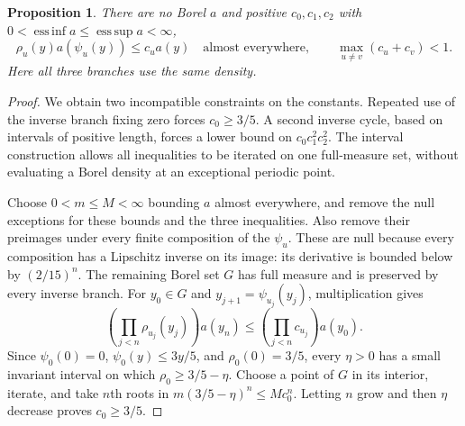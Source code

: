 \documentclass[11pt,reqno]{amsart}
\numberwithin{equation}{section}
\newtheorem{proposition}[theorem]{Proposition}
\theoremstyle{definition}
\theoremstyle{definition}
\begin{document}
\begin{proposition}\label{prop:bounded-density}
There are no Borel $a$ and positive $c_0,c_1,c_2$ with
$0<\operatorname*{ess\,inf}a\le\operatorname*{ess\,sup}a<\infty$,
\[
 \rho_u(y)a(\psi_u(y))\le c_u a(y)\quad\text{almost everywhere},
 \qquad\max_{u\ne v}(c_u+c_v)<1.
\]
Here all three branches use the same density.
\end{proposition}
\begin{proof}
We obtain two incompatible constraints on the constants. Repeated
use of the inverse branch fixing zero forces $c_0\ge3/5$.
A second inverse cycle, based on intervals of positive length,
forces a lower bound on $c_0c_1^2c_2^2$. The interval construction
allows all inequalities to be iterated on one full-measure set,
without evaluating a Borel density at an exceptional periodic point.

Choose $0<m\le M<\infty$ bounding $a$ almost everywhere, and
remove the null exceptions for these bounds and the three inequalities.
Also remove their preimages under every finite composition of the
$\psi_u$. These are null because every composition has a Lipschitz
inverse on its image: its derivative is bounded below by
$(2/15)^n$. The remaining Borel set $G$ has full measure and is
preserved by every inverse branch. For $y_0\in G$ and
$y_{j+1}=\psi_{u_j}(y_j)$, multiplication gives
\begin{equation}\label{eq:density-iterate}
 \left(\prod_{j<n}\rho_{u_j}(y_j)\right)a(y_n)
 \le\left(\prod_{j<n}c_{u_j}\right)a(y_0).
\end{equation}
Since $\psi_0(0)=0$, $\psi_0(y)\le3y/5$, and
$\rho_0(0)=3/5$, every $\eta>0$ has a small invariant interval
on which $\rho_0\ge3/5-\eta$. Choose a point of $G$ in its
interior, iterate, and take $n$th roots in
$m(3/5-\eta)^n\le Mc_0^n$. Letting $n$ grow and then
$\eta$ decrease proves $c_0\ge3/5$.


\end{proof}
\end{document}
